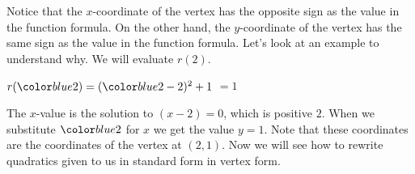 \documentclass{ximera}
\begin{document}
      Notice that the $x$-coordinate of the vertex has the opposite sign as the value in the function formula.
      On the other hand,
      the $y$-coordinate of the vertex has the same sign as the value in the function formula.
      Let's look at an example to understand why.
      We will evaluate $r(2)$.

        $r(\substitute{2})=(\substitute{2}-2)^2+1$
        $=1$

      The $x$-value is the solution to $(x-2)=0$,
      which is positive $2$.
      When we substitute $\substitute{2}$ for $x$ we get the value $y=1$.
      Note that these coordinates are the coordinates of the vertex at $(2,1)$.
      Now we will see how to rewrite quadratics given to us in standard form in vertex form.

\end{document}
